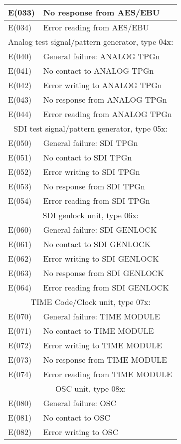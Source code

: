 \begin{longtable}{|l|l|}
E(033)& No response from AES/EBU\\ \hline
E(034)& Error reading from AES/EBU\\ \hline
\multicolumn{2}{|c|}{Analog test signal/pattern generator, type 04x:}\\ \hline
E(040)& General failure: ANALOG TPGn\\ \hline
E(041)& No contact to ANALOG TPGn\\ \hline
E(042)& Error writing to ANALOG TPGn\\ \hline
E(043)& No response from ANALOG TPGn\\ \hline
E(044)& Error reading from ANALOG TPGn\\ \hline
\multicolumn{2}{|c|}{SDI test signal/pattern generator, type 05x:}\\ \hline
E(050)& General failure: SDI TPGn\\ \hline
E(051)& No contact to SDI TPGn\\ \hline
E(052)& Error writing to SDI TPGn\\ \hline
E(053)& No response from SDI TPGn\\ \hline
E(054)& Error reading from SDI TPGn\\ \hline
\multicolumn{2}{|c|}{SDI genlock unit, type 06x:}\\ \hline
E(060)& General failure: SDI GENLOCK\\ \hline
E(061)& No contact to SDI GENLOCK\\ \hline
E(062)& Error writing to SDI GENLOCK\\ \hline
E(063)& No response from SDI GENLOCK\\ \hline
E(064)& Error reading from SDI GENLOCK\\ \hline
\multicolumn{2}{|c|}{TIME Code/Clock unit, type 07x:}\\ \hline
E(070)& General failure: TIME MODULE\\ \hline
E(071)& No contact to TIME MODULE\\ \hline
E(072)& Error writing to TIME MODULE\\ \hline
E(073)& No response from TIME MODULE\\ \hline
E(074)& Error reading from TIME MODULE\\ \hline
\multicolumn{2}{|c|}{OSC unit, type 08x:}\\ \hline
E(080)& General failure: OSC\\ \hline
E(081)& No contact to OSC\\ \hline
E(082)& Error writing to OSC\\ \hline

\end{longtable}
